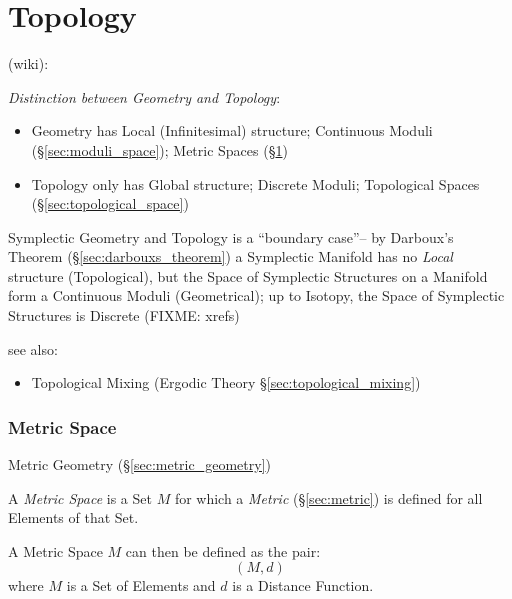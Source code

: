 \part{Topology}\label{part:topology}\cite{lc11}

(wiki):

\emph{Distinction between Geometry and Topology}:
\begin{itemize}
\item Geometry has Local (Infinitesimal) structure; Continuous Moduli
  (\S\ref{sec:moduli_space}); Metric Spaces (\S\ref{sec:metric_space})
\item Topology only has Global structure; Discrete Moduli; Topological Spaces
  (\S\ref{sec:topological_space})
\end{itemize}

Symplectic Geometry and Topology is a ``boundary case''-- by Darboux's Theorem
(\S\ref{sec:darbouxs_theorem}) a Symplectic Manifold has no \emph{Local}
structure (Topological), but the Space of Symplectic Structures on a Manifold
form a Continuous Moduli (Geometrical); up to Isotopy, the Space of Symplectic
Structures is Discrete (FIXME: xrefs)

see also:
\begin{itemize}
  \item Topological Mixing (Ergodic Theory \S\ref{sec:topological_mixing})
\end{itemize}



\section{Metric Space}\label{sec:metric_space}

\fist Metric Geometry (\S\ref{sec:metric_geometry})

A \emph{Metric Space} is a Set $M$ for which a \emph{Metric}
(\S\ref{sec:metric}) is defined for all Elements of that Set.

A Metric Space $M$ can then be defined as the pair:
\[
  (M,d)
\]
where $M$ is a Set of Elements and $d$ is a Distance Function.

